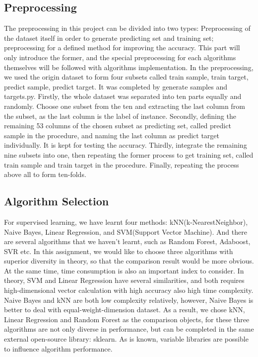\documentclass[12pt]{report}
\begin{document}
\subsection*{Preprocessing}
The preprocessing in this project can be divided into two types: Preprocessing of the dataset itself in order to generate predicting set and training set; preprocessing for a defined method for improving the accuracy. This part will only introduce the former, and the special preprocessing for each algorithms themselves will be followed with algorithms implementation.
\newline
\newline
In the preprocessing, we used the origin dataset to form four subsets called train sample, train target, predict sample, predict target. It was completed by generate samples and targets.py. 
\newline
\newline
Firstly, the whole dataset was separated into ten parts equally and randomly. Choose one subset from the ten and extracting the last column from the subset, as the last column is the label of instance. 
\newline Secondly, defining the remaining 53 columns of the chosen subset as predicting set, called predict sample in the procedure, and naming the last column as predict target individually. It is kept for testing the accuracy.
\newline Thirdly, integrate the remaining nine subsets into one, then repeating the former process to get training set, called train sample and train target in the procedure.
\newline Finally, repeating the process above all to form ten-folds.

\subsection*{Algorithm Selection}
For supervised learning, we have learnt four methods: kNN(k-NearestNeighbor), Naive Bayes, Linear Regression, and SVM(Support Vector Machine). And there are several algorithms that we haven't learnt, such as Random Forest, Adaboost, SVR etc. In this assignment, we would like to choose three algorithms with superior diversity in theory, so that the comparison result would be more obvious. At the same time, time consumption is also an important index to consider. 
\newline
\newline
In theory, SVM and Linear Regression have several similarities, and both requires high-dimensional vector calculation with high accuracy also high time complexity. Naive Bayes and kNN are both low complexity relatively, however, Naive Bayes is better to deal with equal-weight-dimension dataset. 
\newline
\newline
As a result, we chose kNN, Linear Regression and Random Forest as the comparison objects, for these three algorithms are not only diverse in performance, but can be completed in the same external open-source library: sklearn. As is known, variable libraries are possible to influence algorithm performance.
\end{document}
